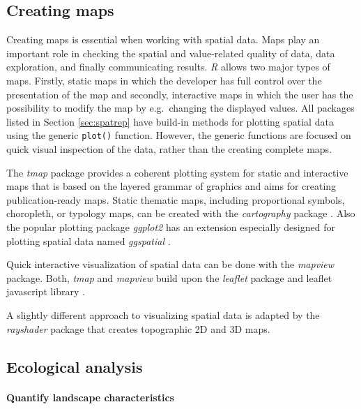 \documentclass[smallextended]{svjour3}       %
\begin{document}
\hypertarget{creating-maps}{%
\subsection{Creating maps}\label{creating-maps}}

Creating maps is essential when working with spatial data.
Maps play an important role in checking the spatial and value-related quality of data, data exploration, and finally communicating results.
\emph{R} allows two major types of maps.
Firstly, static maps in which the developer has full control over the presentation of the map and secondly, interactive maps in which the user has the possibility to modify the map by e.g.~changing the displayed values.
All packages listed in Section \ref{sec:spatrep} have build-in methods for plotting spatial data using the generic \texttt{plot()} function.
However, the generic functions are focused on quick visual inspection of the data, rather than the creating complete maps.

The \emph{tmap} package provides a coherent plotting system for static and interactive maps that is based on the layered grammar of graphics \cite{Tennekes2018} and aims for creating publication-ready maps.
Static thematic maps, including proportional symbols, choropleth, or typology maps, can be created with the \emph{cartography} package \cite{Giraud2016}.
Also the popular plotting package \emph{ggplot2} \cite{Wickham2016a} has an extension especially designed for plotting spatial data named \emph{ggspatial} \cite{R-ggspatial}.

Quick interactive visualization of spatial data can be done with the \emph{mapview} package\cite{R-mapview}.
Both, \emph{tmap} and \emph{mapview} build upon the \emph{leaflet} package and leaflet javascript library \cite{R-leaflet}.

A slightly different approach to visualizing spatial data is adapted by the \emph{rayshader} package \cite{Morgen-Wall2020} that creates topographic 2D and 3D maps.

\hypertarget{sec:ecological_analysis}{%
\subsection{Ecological analysis}\label{sec:ecological_analysis}}

\hypertarget{sec:landscape_metrics}{%
\paragraph{Quantify landscape characteristics}\label{sec:landscape_metrics}}
\end{document}
